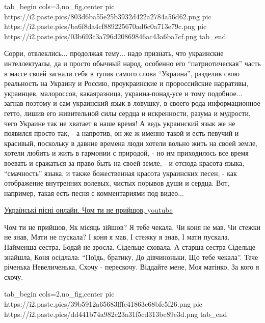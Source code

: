 \ifcmt
  tab_begin cols=3,no_fig,center
     pic https://i2.paste.pics/803d6ba55e25b3932d422a2784a56d62.png
     pic https://i2.paste.pics/ba6f8da4cf889225670ad6c0a713e79c.png
     pic https://i2.paste.pics/03b693c3a796d20869846ac43a6ba7cf.png
  tab_end
\fi

Сорри, отвлеклись... продолжая тему... надо признать, что украинские
интеллектуалы, да и просто обычный народ, особенно его \enquote{патриотическая}
часть в массе своей загнали себя в тупик самого слова \enquote{Украина},
разделив свою реальность на Украину и Россию, проукраинские и пророссийские
нарративы, украинцев, малороссов, какаяразница, украина-понад-усе и тому
подобное... загнав поэтому и сам украинский язык в ловушку, в своего рода
информационное гетто, лишив его живительной силы сердца и искренности, разума и
мудрости, чего Украине так не хватает в наше время! А ведь украинский язык же
не появился просто так, - а напротив, он же ж именно такой и есть певучий и
красивый, поскольку в давние времена люди хотели вольно жить на своей земле,
хотели любить и жить в гармонии с природой, - но им приходилось все время
воевать и сражаться за право быть на своей земле, - и отсюда красота языка,
\enquote{смачность} языка,  и также божественная красота украинских песен, -
как отображение внутренних волевых, чистых порывов души и сердца. Вот,
например, такая есть песня с комментариями под видео... 

\href{https://www.youtube.com/watch?v=--iWRp8Jr6k}{%
Українські пісні онлайн. Чом ти не прийшов, youtube}

\raggedcolumns
\begin{multicols}{4} %
\setlength{\parindent}{0pt}
\obeycr
Чом ти не прийшов,
Як місяць зійшов?
Я тебе чекала.
Чи коня не мав,
Чи стежки не знав,
Мати не пускала?
\smallskip
І коня я мав,
І стежку я знав,
І мати пускала.
Найменша сестра,
Бодай не зросла,
Сідельце сховала.
\smallskip
А старша сестра
Сідельце знайшла,
Коня осідлала:
\enquote{Поїдь, братику,
До дівчиноньки,
Що тебе чекала}.
\smallskip
Тече річенька
Невеличенька,
Схочу - перескочу.
Віддайте мене,
Моя матінко,
За кого я схочу.
\restorecr
\end{multicols} %

\ifcmt
  tab_begin cols=2,no_fig,center
     pic https://i2.paste.pics/39b5912a65683fffc41863c68bfc5f26.png
     pic https://i2.paste.pics/dd441b74a982c23a31f5cd313bc89e3d.png
  tab_end
\fi

